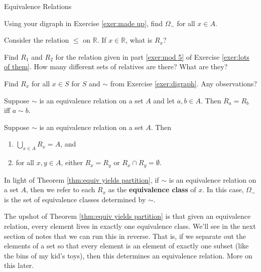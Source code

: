 \begin{section}{Equivalence Relations}
\begin{exercise}
Using your digraph in Exercise \ref{exer:made up}, find $\Omega_{\sim}$ for all $x\in A$.  
\end{exercise}

\begin{exercise}
Consider the relation $\leq$ on $\mathbb{R}$.  If $x\in \mathbb{R}$, what is $R_x$?
\end{exercise}

\begin{exercise}
Find $R_1$ and $R_{2}$ for the relation given in part \ref{exer:mod 5} of Exercise \ref{exer:lots of them}.  How many different sets of relatives are there?  What are they?
\end{exercise}

\begin{exercise}
Find $R_x$ for all $x\in S$ for $S$ and $\sim$ from Exercise \ref{exer:digraph}.  Any observations?
\end{exercise}

\begin{theorem}[*]
Suppose $\sim$ is an equivalence relation on a set $A$ and let $a,b\in A$.  Then $R_a=R_b$ iff $a\sim b$.
\end{theorem}

\begin{theorem}[*]\label{thm:equiv yields partition}
Suppose $\sim$ is an equivalence relation on a set $A$.  Then
\begin{enumerate}
\item $\bigcup_{x\in A}R_x=A$, and
\item for all $x,y\in A$, either $R_x=R_y$ or $R_x\cap R_y=\emptyset$.
\end{enumerate}
\end{theorem}

\begin{definition}
In light of Theorem \ref{thm:equiv yields partition}, if $\sim$ is an equivalence relation on a set $A$, then we refer to each $R_x$ as the \textbf{equivalence class} of $x$.  In this case, $\Omega_{\sim}$ is the set of equivalence classes determined by $\sim$.
\end{definition}

\begin{remark}
The upshot of Theorem \ref{thm:equiv yields partition} is that given an equivalence relation, every element lives in exactly one equivalence class.  We'll see in the next section of notes that we can run this in reverse.  That is, if we separate out the elements of a set so that every element is an element of exactly one subset (like the bins of my kid's toys), then this determines an equivalence relation.  More on this later.
\end{remark}


\end{section}
